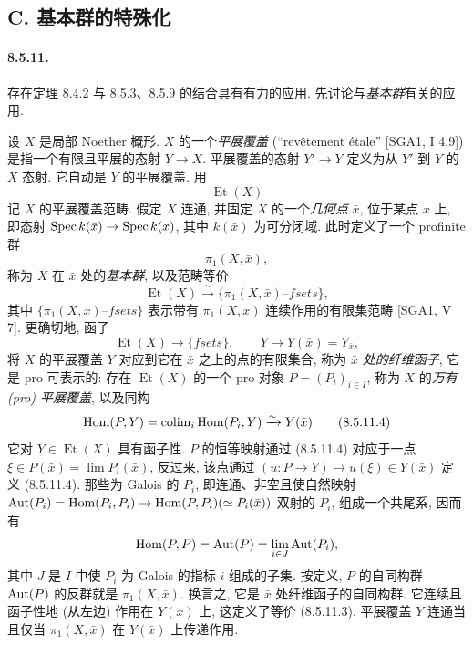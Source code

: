\subsection*{C. 基本群的特殊化}
\paragraph{8.5.11.}
存在定理 8.4.2 与 8.5.3、8.5.9 的结合具有有力的应用. 先讨论与\emph{基本群}有关的应用.

设 $X$ 是局部 Noether 概形. $X$ 的一个\emph{平展覆盖} (``revêtement étale'' [SGA1, I 4.9]) 是指一个有限且平展的态射 $Y\to X$. 平展覆盖的态射 $Y'\to Y$ 定义为从 $Y'$ 到 $Y$ 的 $X$ 态射. 它自动是 $Y$ 的平展覆盖. 用
\begin{equation}\operatorname{Et}(X)\tag{8.5.11.1}\label{ch08:eq85111}\end{equation}
记 $X$ 的平展覆盖范畴. 假定 $X$ 连通, 并固定 $X$ 的一个\emph{几何点} $\bar x$, 位于某点 $x$ 上, 即态射 $\operatorname{Spec} k(\bar x)\to\operatorname{Spec} k(x)$, 其中 $k(\bar x)$ 为可分闭域. 此时定义了一个 profinite 群
\begin{equation}\pi_1(X,\bar x),\tag{8.5.11.2}\label{ch08:eq85112}\end{equation}
称为 $X$ 在 $\bar x$ 处的\emph{基本群}, 以及范畴等价
\begin{equation}\operatorname{Et}(X)\xrightarrow\sim\{\pi_1(X,\bar x)\text{--}fsets\},\tag{8.5.11.3}\label{ch08:eq85113}\end{equation}
其中 $\{\pi_1(X,\bar x)\text{--}fsets\}$ 表示带有 $\pi_1(X,\bar x)$ 连续作用的有限集范畴 [SGA1, V 7]. 更确切地, 函子
\[\operatorname{Et}(X)\longrightarrow\{fsets\},\qquad Y\longmapsto Y(\bar x)=Y_{\bar x},\]
将 $X$ 的平展覆盖 $Y$ 对应到它在 $\bar x$ 之上的点的有限集合, 称为 $\bar x$ \emph{处的纤维函子}, 它是 pro 可表示的: 存在 $\operatorname{Et}(X)$ 的一个 pro 对象 $P=(P_i)_{i\in I}$, 称为 $X$ 的\emph{万有 (pro) 平展覆盖}, 以及同构
\begin{equation}\operatorname{Hom}(P,Y)=\operatorname{colim}_i\operatorname{Hom}(P_i,Y)\xrightarrow\sim Y(\bar x)\tag{8.5.11.4}\label{ch08:eq85114}\end{equation}
它对 $Y\in\operatorname{Et}(X)$ 具有函子性. $P$ 的恒等映射通过 (8.5.11.4) 对应于一点 $\xi\in P(\bar x)=\lim P_i(\bar x)$, 反过来, 该点通过 $(u:P\to Y)\mapsto u(\xi)\in Y(\bar x)$ 定义 (8.5.11.4). 那些为 Galois 的 $P_i$, 即连通、非空且使自然映射 $\operatorname{Aut}(P_i)=\operatorname{Hom}(P_i,P_i)\to\operatorname{Hom}(P,P_i)(\simeq P_i(\bar x))$ 双射的 $P_i$, 组成一个共尾系, 因而有
\[\operatorname{Hom}(P,P)=\operatorname{Aut}(P)=\lim_{i\in J}\operatorname{Aut}(P_i),\]
其中 $J$ 是 $I$ 中使 $P_i$ 为 Galois 的指标 $i$ 组成的子集. 按定义, $P$ 的自同构群 $\operatorname{Aut}(P)$ 的反群就是 $\pi_1(X,\bar x)$. 换言之, 它是 $\bar x$ 处纤维函子的自同构群. 它连续且函子性地 (从左边) 作用在 $Y(\bar x)$ 上, 这定义了等价 (8.5.11.3). 平展覆盖 $Y$ 连通当且仅当 $\pi_1(X,\bar x)$ 在 $Y(\bar x)$ 上传递作用.

